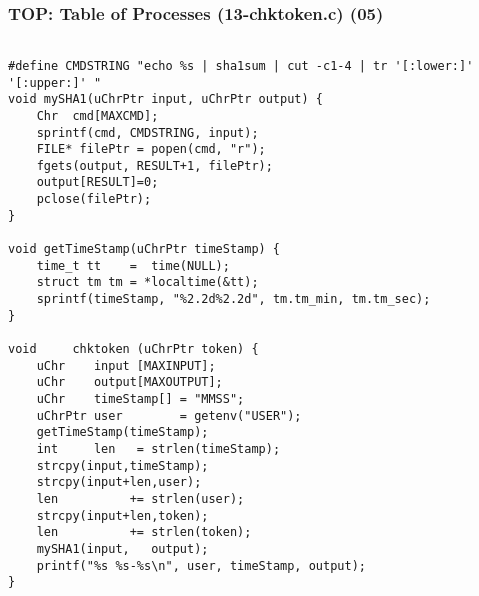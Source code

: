 \documentclass[xcolor=table, notheorems, hyperref={pdfpagelabels=false}]{beamer}
\begin{document}
\begin{frame}[fragile]
\frametitle{TOP: Table of Processes (13-chktoken.c) (05)}
\begin{lstlisting}[basicstyle=\ttfamily\tiny]

#define CMDSTRING "echo %s | sha1sum | cut -c1-4 | tr '[:lower:]' '[:upper:]' "
void mySHA1(uChrPtr input, uChrPtr output) {
    Chr  cmd[MAXCMD];
    sprintf(cmd, CMDSTRING, input);
    FILE* filePtr = popen(cmd, "r");
    fgets(output, RESULT+1, filePtr);
    output[RESULT]=0;
    pclose(filePtr);
}

void getTimeStamp(uChrPtr timeStamp) {
    time_t tt    =  time(NULL);
    struct tm tm = *localtime(&tt);
    sprintf(timeStamp, "%2.2d%2.2d", tm.tm_min, tm.tm_sec);
}

void     chktoken (uChrPtr token) {
    uChr    input [MAXINPUT];
    uChr    output[MAXOUTPUT];
    uChr    timeStamp[] = "MMSS";
    uChrPtr user        = getenv("USER");
    getTimeStamp(timeStamp);
    int     len   = strlen(timeStamp);
    strcpy(input,timeStamp);
    strcpy(input+len,user);
    len          += strlen(user);
    strcpy(input+len,token);
    len          += strlen(token);
    mySHA1(input,   output);
    printf("%s %s-%s\n", user, timeStamp, output);
}

\end{lstlisting}
\end{frame}
\end{document}
